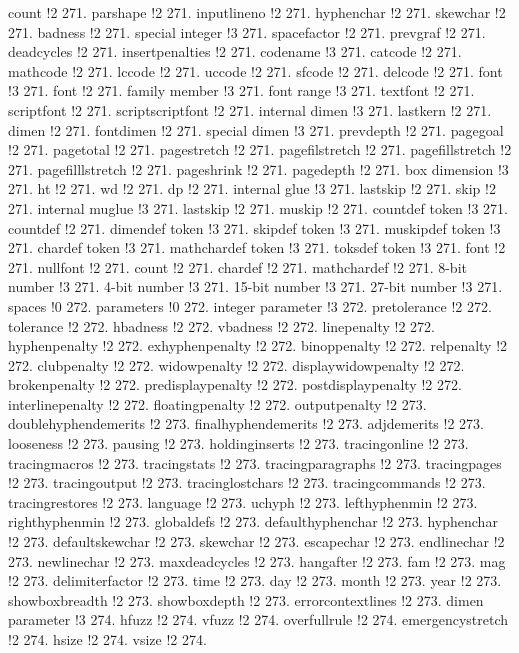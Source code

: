 count !2 271.
parshape !2 271.
inputlineno !2 271.
hyphenchar !2 271.
skewchar !2 271.
badness !2 271.
special integer !3 271.
spacefactor !2 271.
prevgraf !2 271.
deadcycles !2 271.
insertpenalties !2 271.
codename !3 271.
catcode !2 271.
mathcode !2 271.
lccode !2 271.
uccode !2 271.
sfcode !2 271.
delcode !2 271.
font !3 271.
font !2 271.
family member !3 271.
font range !3 271.
textfont !2 271.
scriptfont !2 271.
scriptscriptfont !2 271.
internal dimen !3 271.
lastkern !2 271.
dimen !2 271.
fontdimen !2 271.
special dimen !3 271.
prevdepth !2 271.
pagegoal !2 271.
pagetotal !2 271.
pagestretch !2 271.
pagefilstretch !2 271.
pagefillstretch !2 271.
pagefilllstretch !2 271.
pageshrink !2 271.
pagedepth !2 271.
box dimension !3 271.
ht !2 271.
wd !2 271.
dp !2 271.
internal glue !3 271.
lastskip !2 271.
skip !2 271.
internal muglue !3 271.
lastskip !2 271.
muskip !2 271.
countdef token !3 271.
countdef !2 271.
dimendef token !3 271.
skipdef token !3 271.
muskipdef token !3 271.
chardef token !3 271.
mathchardef token !3 271.
toksdef token !3 271.
font !2 271.
nullfont !2 271.
count !2 271.
chardef !2 271.
mathchardef !2 271.
8-bit number !3 271.
4-bit number !3 271.
15-bit number !3 271.
27-bit number !3 271.
spaces !0 272.
parameters !0 272.
integer parameter !3 272.
pretolerance !2 272.
tolerance !2 272.
hbadness !2 272.
vbadness !2 272.
linepenalty !2 272.
hyphenpenalty !2 272.
exhyphenpenalty !2 272.
binoppenalty !2 272.
relpenalty !2 272.
clubpenalty !2 272.
widowpenalty !2 272.
displaywidowpenalty !2 272.
brokenpenalty !2 272.
predisplaypenalty !2 272.
postdisplaypenalty !2 272.
interlinepenalty !2 272.
floatingpenalty !2 272.
outputpenalty !2 273.
doublehyphendemerits !2 273.
finalhyphendemerits !2 273.
adjdemerits !2 273.
looseness !2 273.
pausing !2 273.
holdinginserts !2 273.
tracingonline !2 273.
tracingmacros !2 273.
tracingstats !2 273.
tracingparagraphs !2 273.
tracingpages !2 273.
tracingoutput !2 273.
tracinglostchars !2 273.
tracingcommands !2 273.
tracingrestores !2 273.
language !2 273.
uchyph !2 273.
lefthyphenmin !2 273.
righthyphenmin !2 273.
globaldefs !2 273.
defaulthyphenchar !2 273.
hyphenchar !2 273.
defaultskewchar !2 273.
skewchar !2 273.
escapechar !2 273.
endlinechar !2 273.
newlinechar !2 273.
maxdeadcycles !2 273.
hangafter !2 273.
fam !2 273.
mag !2 273.
delimiterfactor !2 273.
time !2 273.
day !2 273.
month !2 273.
year !2 273.
showboxbreadth !2 273.
showboxdepth !2 273.
errorcontextlines !2 273.
dimen parameter !3 274.
hfuzz !2 274.
vfuzz !2 274.
overfullrule !2 274.
emergencystretch !2 274.
hsize !2 274.
vsize !2 274.
